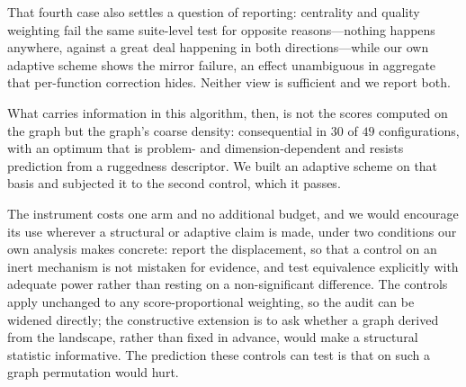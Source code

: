 That fourth case also settles a question of reporting: centrality and quality
weighting fail the same suite-level test for opposite reasons---nothing happens
anywhere, against a great deal happening in both directions---while our own
adaptive scheme shows the mirror failure, an effect unambiguous in aggregate
that per-function correction hides. Neither view is sufficient and we report
both.

What carries information in this algorithm, then, is not the scores computed on
the graph but the graph's coarse density: consequential in $30$ of $49$
configurations, with an optimum that is problem- and dimension-dependent and
resists prediction from a ruggedness descriptor. We built an adaptive scheme on
that basis and subjected it to the second control, which it passes.

The instrument costs one arm and no additional budget, and we would encourage
its use wherever a structural or adaptive claim is made, under two conditions
our own analysis makes concrete: report the displacement, so that a control on
an inert mechanism is not mistaken for evidence, and test equivalence
explicitly with adequate power rather than resting on a non-significant
difference. The controls apply unchanged to any score-proportional weighting,
so the audit can be widened directly; the constructive extension is to ask
whether a graph derived from the landscape, rather than fixed in advance, would
make a structural statistic informative. The prediction these controls can test
is that on such a graph permutation would hurt.
